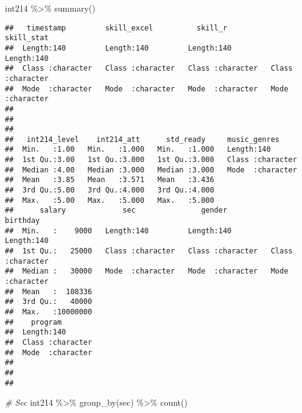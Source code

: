 \documentclass[
]{article}
\newenvironment{Shaded}{\begin{snugshade}}{\end{snugshade}}
\newcommand{\CommentTok}[1]{\textcolor[rgb]{0.56,0.35,0.01}{\textit{#1}}}
\newcommand{\FunctionTok}[1]{\textcolor[rgb]{0.00,0.00,0.00}{#1}}
\newcommand{\NormalTok}[1]{#1}
\newcommand{\SpecialCharTok}[1]{\textcolor[rgb]{0.00,0.00,0.00}{#1}}
\begin{document}
\begin{Shaded}
\begin{Highlighting}[]
\NormalTok{int214 }\SpecialCharTok{\%\textgreater{}\%} \FunctionTok{summary}\NormalTok{()}
\end{Highlighting}
\end{Shaded}

\begin{verbatim}
##   timestamp         skill_excel          skill_r           skill_stat       
##  Length:140         Length:140         Length:140         Length:140        
##  Class :character   Class :character   Class :character   Class :character  
##  Mode  :character   Mode  :character   Mode  :character   Mode  :character  
##                                                                             
##                                                                             
##                                                                             
##   int214_level    int214_att      std_ready     music_genres      
##  Min.   :1.00   Min.   :1.000   Min.   :1.000   Length:140        
##  1st Qu.:3.00   1st Qu.:3.000   1st Qu.:3.000   Class :character  
##  Median :4.00   Median :3.000   Median :3.000   Mode  :character  
##  Mean   :3.85   Mean   :3.571   Mean   :3.436                     
##  3rd Qu.:5.00   3rd Qu.:4.000   3rd Qu.:4.000                     
##  Max.   :5.00   Max.   :5.000   Max.   :5.000                     
##      salary             sec               gender            birthday        
##  Min.   :    9000   Length:140         Length:140         Length:140        
##  1st Qu.:   25000   Class :character   Class :character   Class :character  
##  Median :   30000   Mode  :character   Mode  :character   Mode  :character  
##  Mean   :  108336                                                           
##  3rd Qu.:   40000                                                           
##  Max.   :10000000                                                           
##    program         
##  Length:140        
##  Class :character  
##  Mode  :character  
##                    
##                    
## 
\end{verbatim}

\begin{Shaded}
\begin{Highlighting}[]
\CommentTok{\# Sec}
\NormalTok{int214 }\SpecialCharTok{\%\textgreater{}\%} \FunctionTok{group\_by}\NormalTok{(sec) }\SpecialCharTok{\%\textgreater{}\%} \FunctionTok{count}\NormalTok{()}
\end{Highlighting}
\end{Shaded}
\end{document}
